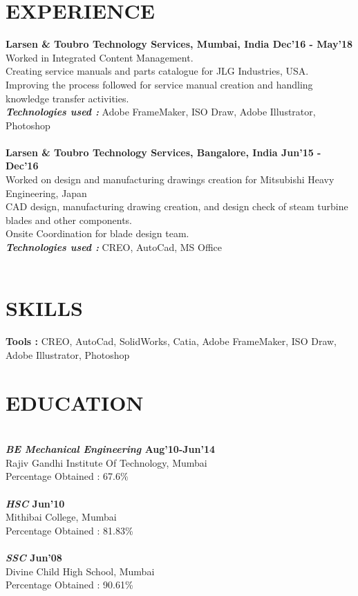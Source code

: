 \documentclass[line, margin]{res}
\begin{document}
\address{ +91 9969920002, kapadia.nimisha@siom.in}
\begin{resume}

\section{EXPERIENCE} 
\textbf{Larsen \& Toubro Technology Services, Mumbai, India \hfill Dec'16 - May'18} \\
Worked in Integrated Content Management. \\
Creating service manuals and parts catalogue for JLG Industries, USA. \\ 
Improving the process followed for service manual creation and handling knowledge transfer activities. \\
\textbf{\textit{Technologies used : }} Adobe FrameMaker, ISO Draw, Adobe Illustrator, Photoshop \\
\\
\textbf{Larsen \& Toubro Technology Services, Bangalore, India \hfill Jun'15 - Dec'16} \\
Worked on design and manufacturing drawings creation for Mitsubishi Heavy Engineering, Japan \\
CAD design, manufacturing drawing creation, and design check of steam turbine blades and other components. \\
Onsite Coordination for blade design team. \\
\textbf{\textit{Technologies used : }} CREO, AutoCad, MS Office \\
\\

\section{SKILLS} 
\textbf{Tools : }CREO, AutoCad, SolidWorks, Catia, Adobe FrameMaker, ISO Draw, Adobe Illustrator, Photoshop \\

\section{EDUCATION} 
\\
\textbf{\textit{BE Mechanical Engineering} \hfill Aug'10-Jun'14} \\
Rajiv Gandhi Institute Of Technology, Mumbai \\
Percentage Obtained : 67.6\% \\
\\
\textbf{\textit{HSC} \hfill Jun'10} \\
Mithibai College, Mumbai \\
Percentage Obtained : 81.83\% \\
\\
\textbf{\textit{SSC} \hfill Jun'08} \\
Divine Child High School, Mumbai \\
Percentage Obtained : 90.61\% \\


\end{resume}
\end{document}

